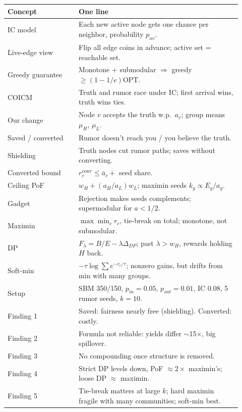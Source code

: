 \documentclass[11pt]{article}
\begin{document}
\begin{center}
\renewcommand{\arraystretch}{1.25}
\begin{tabular}{p{0.28\linewidth}p{0.64\linewidth}}
\toprule
\textbf{Concept} & \textbf{One line} \\
\midrule
IC model & Each new active node gets one chance per neighbor, probability $p_{uv}$. \\
Live-edge view & Flip all edge coins in advance; active set = reachable set. \\
Greedy guarantee & Monotone + submodular $\Rightarrow$ greedy $\ge(1-1/e)$OPT. \\
COICM & Truth and rumor race under IC; first arrival wins, truth wins ties. \\
Our change & Node $v$ accepts the truth w.p.\ $a_v$; group means $\mu_H$, $\mu_L$. \\
Saved / converted & Rumor doesn't reach you / you believe the truth. \\
Shielding & Truth nodes cut rumor paths; saves without converting. \\
Converted bound & $r_c^{\mathrm{conv}}\le\bar a_c+$ seed share. \\
Ceiling PoF & $w_H+(a_H/a_L)w_L$; maximin seeds $k_g\propto E_g/a_g$. \\
Gadget & Rejection makes seeds complements; supermodular for $a<1/2$. \\
Maximin & $\max\min_c r_c$, tie-break on total; monotone, not submodular. \\
DP & $F_\lambda=B/E-\lambda\Delta_{DP}$; past $\lambda>w_H$, rewards holding $H$ back. \\
Soft-min & $-\tau\log\sum e^{-r_c/\tau}$; nonzero gains, but drifts from min with many groups. \\
Setup & SBM 350/150, $p_{in}=0.05$, $p_{out}=0.01$, IC $0.08$, 5 rumor seeds, $k=10$. \\
\midrule
Finding 1 & Saved: fairness nearly free (shielding). Converted: costly. \\
Finding 2 & Formula not reliable: yields differ $\sim$15$\times$, big spillover. \\
Finding 3 & No compounding once structure is removed. \\
Finding 4 & Strict DP levels down, PoF $\approx2\times$ maximin's; loose DP $\approx$ maximin. \\
Finding 5 & Tie-break matters at large $k$; hard maximin fragile with many communities; soft-min best. \\
\bottomrule
\end{tabular}
\end{center}
\end{document}
